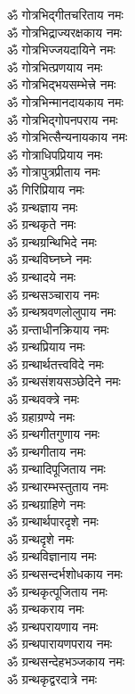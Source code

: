 \begin{multicols}{2}
\begin{flushleft}
ॐ गोत्रभिद्गीतचरिताय नमः\\
ॐ गोत्रभिद्राज्यरक्षकाय नमः\\
ॐ गोत्रभिज्जयदायिने नमः\\
ॐ गोत्रभित्प्रणयाय नमः\\
ॐ गोत्रभिद्भयसम्भेत्त्रे नमः\\
ॐ गोत्रभिन्मानदायकाय नमः\\
ॐ गोत्रभिद्गोपनपराय नमः\hfill{}\\
ॐ गोत्रभित्सैन्यनायकाय नमः\\
ॐ गोत्राधिपप्रियाय नमः\\
ॐ गोत्रापुत्रप्रीताय नमः\\
ॐ गिरिप्रियाय नमः\\
ॐ ग्रन्थज्ञाय नमः\\
ॐ ग्रन्थकृते नमः\\
ॐ ग्रन्थग्रन्थिभिदे नमः\\
ॐ ग्रन्थविघ्नघ्ने नमः\\
ॐ ग्रन्थादये नमः\\
ॐ ग्रन्थसञ्चाराय नमः\hfill{}\\
ॐ ग्रन्थश्रवणलोलुपाय नमः\\
ॐ ग्रन्ताधीनक्रियाय नमः\\
ॐ ग्रन्थप्रियाय नमः\\
ॐ ग्रन्थार्थतत्त्वविदे नमः\\
ॐ ग्रन्थसंशयसञ्छेदिने नमः\\
ॐ ग्रन्थवक्त्रे नमः\\
ॐ ग्रहाग्रण्ये नमः\\
ॐ ग्रन्थगीतगुणाय नमः\\
ॐ ग्रन्थगीताय नमः\\
ॐ ग्रन्थादिपूजिताय नमः\hfill{}\\
ॐ ग्रन्थारम्भस्तुताय नमः\\
ॐ ग्रन्थग्राहिणे नमः\\
ॐ ग्रन्थार्थपारदृशे नमः\\
ॐ ग्रन्थदृशे नमः\\
ॐ ग्रन्थविज्ञानाय नमः\\
ॐ ग्रन्थसन्दर्भशोधकाय नमः\\
ॐ ग्रन्थकृत्पूजिताय नमः\\
ॐ ग्रन्थकराय नमः\\
ॐ ग्रन्थपरायणाय नमः\\
ॐ ग्रन्थपारायणपराय नमः\hfill{}\\
ॐ ग्रन्थसन्देहभञ्जकाय नमः\\
ॐ ग्रन्थकृद्वरदात्रे नमः\\

\end{flushleft}
\end{multicols}
